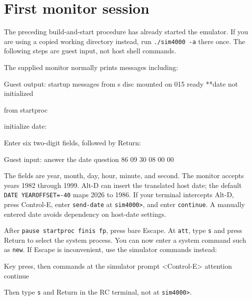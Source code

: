 \chapter{First monitor session}\label{first-monitor-session}

The preceding build-and-start procedure has already started the emulator.
If you are using a copied working directory instead, run \texttt{./sim4000 -a}
there once. The following steps are guest input, not host shell commands.

The supplied monitor normally prints messages including:

\begin{commandexample}{Guest output: startup messages}
from s
disc         mounted on 015
ready  **date not initialized

from startproc

initialize date:
\end{commandexample}

Enter six two-digit fields, followed by Return:

\begin{commandexample}{Guest input: answer the date question}
86 09 30 08 00 00
\end{commandexample}

The fields are year, month, day, hour, minute, and second. The monitor accepts years 1982 through 1999. Alt-D can insert the translated host date; the default \passthrough{\lstinline!DATE YEAROFFSET=-40!} maps 2026 to 1986. If your terminal intercepts Alt-D, press Control-E, enter \passthrough{\lstinline!send-date!} at \passthrough{\lstinline!sim4000>!}, and enter \passthrough{\lstinline!continue!}. A manually entered date avoids dependency on host-date settings.

After \passthrough{\lstinline!pause startproc finis fp!}, press bare Escape. At \passthrough{\lstinline!att!}, type \passthrough{\lstinline!s!} and press Return to select the system process. You can now enter a system command such as \passthrough{\lstinline!new!}. If Escape is inconvenient, use the simulator commands instead:

\begin{commandexample}{Key press, then commands at the simulator prompt}
<Control-E>
attention
continue
\end{commandexample}

Then type \passthrough{\lstinline!s!} and Return in the RC terminal, not at \passthrough{\lstinline!sim4000>!}.

